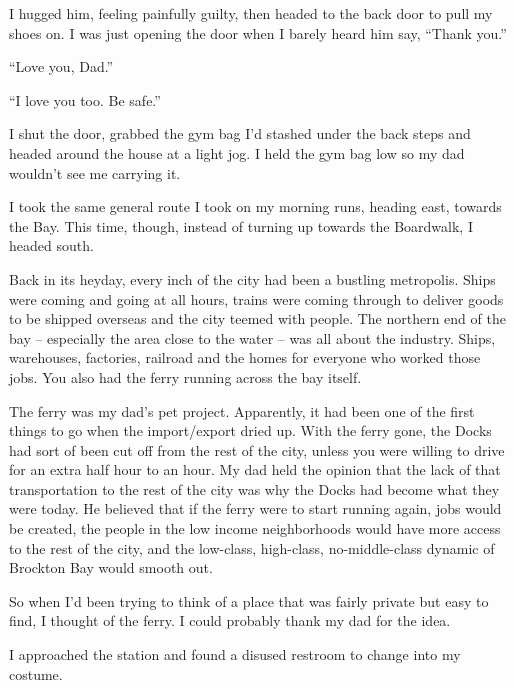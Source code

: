 I hugged him, feeling painfully guilty, then headed to the back door to pull my shoes on.  I was just opening the door when I barely heard him say, ``Thank you.''



``Love you, Dad.''



``I love you too.  Be safe.''



I shut the door, grabbed the gym bag I'd stashed under the back steps and headed around the house at a light jog.  I held the gym bag low so my dad wouldn't see me carrying it.



I took the same general route I took on my morning runs, heading east, towards the Bay.  This time, though, instead of turning up towards the Boardwalk, I headed south.



Back in its heyday, every inch of the city had been a bustling metropolis.  Ships were coming and going at all hours, trains were coming through to deliver goods to be shipped overseas and the city teemed with people.  The northern end of the bay – especially the area close to the water – was all about the industry.  Ships, warehouses, factories, railroad and the homes for everyone who worked those jobs.  You also had the ferry running across the bay itself.



The ferry was my dad's pet project.  Apparently, it had been one of the first things to go when the import/export dried up.  With the ferry gone, the Docks had sort of been cut off from the rest of the city, unless you were willing to drive for an extra half hour to an hour.  My dad held the opinion that the lack of that transportation to the rest of the city was why the Docks had become what they were today.  He believed that if the ferry were to start running  again, jobs would be created, the people in the low income neighborhoods would have more access to the rest of the city, and the low-class, high-class, no-middle-class dynamic of Brockton Bay would smooth out.



So when I'd been trying to think of a place that was fairly private but easy to find, I thought of the ferry.  I could probably thank my dad for the idea.



I approached the station and found a disused restroom to change into my costume.



